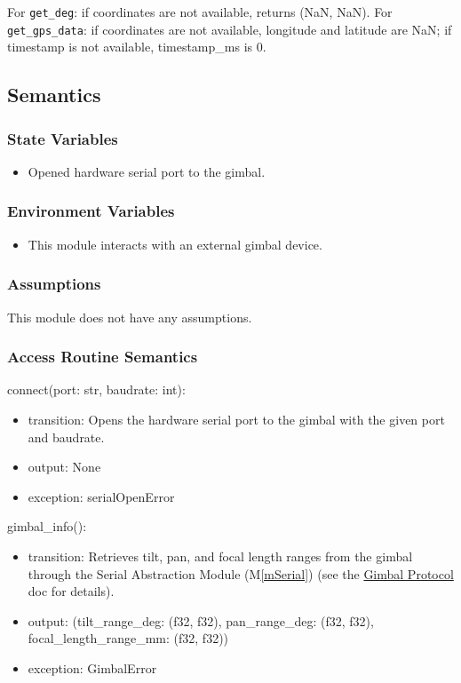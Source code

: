 \documentclass[12pt, titlepage]{article}
\newcommand{\mref}[1]{M\ref{#1}}
\begin{document}
\noindent For \texttt{get\_deg}: if coordinates are not available, returns (NaN, NaN). For \texttt{get\_gps\_data}: if coordinates are not available, longitude and latitude are NaN; if timestamp is not available, timestamp\_ms is 0.

\subsection{Semantics}

\subsubsection{State Variables}

\begin{itemize}
  \item Opened hardware serial port to the gimbal.
\end{itemize}

\subsubsection{Environment Variables}

\begin{itemize}
  \item This module interacts with an external gimbal device.
\end{itemize}

\subsubsection{Assumptions}

This module does not have any assumptions.

\subsubsection{Access Routine Semantics}

\noindent connect(port: str, baudrate: int):
\begin{itemize}
  \item transition: Opens the hardware serial port to the gimbal with the given port
        and baudrate.
  \item output: None
  \item exception: serialOpenError
\end{itemize}

\noindent gimbal\_info():
\begin{itemize}
  \item transition: Retrieves tilt, pan, and focal length ranges from the gimbal
        through the Serial Abstraction Module (\mref{mSerial}) (see the
        \href{https://github.com/SpaceY-Labs/RoCam/blob/main/docs/Design/GimbalProtocol/GimbalProtocol.pdf}{Gimbal
          Protocol} doc for details).
  \item output: (tilt\_range\_deg: (f32, f32), pan\_range\_deg: (f32, f32),
        focal\_length\_range\_mm: (f32, f32))
  \item exception: GimbalError
\end{itemize}
\end{document}
